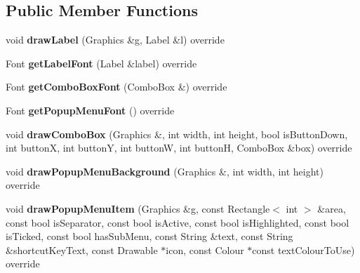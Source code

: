 \subsection*{Public Member Functions}
\begin{DoxyCompactItemize}
\item 
\mbox{\label{class_custom_look_and_feel2_af458a778de3ecbe3e30d6f6763820b59}} 
void {\bfseries draw\+Label} (Graphics \&g, Label \&l) override
\item 
\mbox{\label{class_custom_look_and_feel2_a94c105e1995b3509816039e911acb8fd}} 
Font {\bfseries get\+Label\+Font} (Label \&label) override
\item 
\mbox{\label{class_custom_look_and_feel2_a7ce673f54627be54a05346bc2baf6a2a}} 
Font {\bfseries get\+Combo\+Box\+Font} (Combo\+Box \&) override
\item 
\mbox{\label{class_custom_look_and_feel2_a1a9d17c0d894571deb9b0c2d61f7cd57}} 
Font {\bfseries get\+Popup\+Menu\+Font} () override
\item 
\mbox{\label{class_custom_look_and_feel2_aad9b62f9a68c93c493eaf0c5b6fee67a}} 
void {\bfseries draw\+Combo\+Box} (Graphics \&, int width, int height, bool is\+Button\+Down, int buttonX, int buttonY, int buttonW, int buttonH, Combo\+Box \&box) override
\item 
\mbox{\label{class_custom_look_and_feel2_a27d2c609e7f04bb787e673f4e28f7a43}} 
void {\bfseries draw\+Popup\+Menu\+Background} (Graphics \&, int width, int height) override
\item 
\mbox{\label{class_custom_look_and_feel2_a9bbc0e0fdd7e2e0476b01cd7febeaecb}} 
void {\bfseries draw\+Popup\+Menu\+Item} (Graphics \&g, const Rectangle$<$ int $>$ \&area, const bool is\+Separator, const bool is\+Active, const bool is\+Highlighted, const bool is\+Ticked, const bool has\+Sub\+Menu, const String \&text, const String \&shortcut\+Key\+Text, const Drawable $\ast$icon, const Colour $\ast$const text\+Colour\+To\+Use) override
\item 
\mbox{\label{class_custom_look_and_feel2_a278139ebf6e784b25bb4ba0c104938b0}} 

\end{DoxyCompactItemize}
